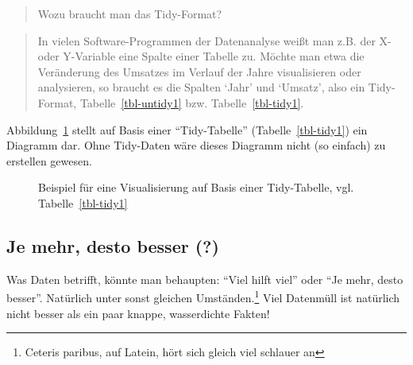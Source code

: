 \documentclass[
  a4paper,
]{scrbook}
\theoremstyle{definition}
\theoremstyle{definition}
\theoremstyle{definition}
\theoremstyle{remark}
\begin{document}
\begin{quote}
{} Wozu braucht man das Tidy-Format?
\end{quote}

\begin{quote}
{} In vielen Software-Programmen der Datenanalyse
weißt man z.B. der X- oder Y-Variable eine Spalte einer Tabelle zu.
Möchte man etwa die Veränderung des Umsatzes im Verlauf der Jahre
visualisieren oder analysieren, so braucht es die Spalten `Jahr' und
`Umsatz', also ein Tidy-Format, Tabelle~\ref{tbl-untidy1} bzw.
Tabelle~\ref{tbl-tidy1}.
\end{quote}

Abbildung~\ref{fig-tidy} stellt auf Basis einer ``Tidy-Tabelle''
(Tabelle~\ref{tbl-tidy1}) ein Diagramm dar. Ohne Tidy-Daten wäre dieses
Diagramm nicht (so einfach) zu erstellen gewesen.

\begin{figure}


\caption{\label{fig-tidy}Beispiel für eine Visualisierung auf Basis
einer Tidy-Tabelle, vgl. Tabelle~\ref{tbl-tidy1}}

\end{figure}%

\subsection{Je mehr, desto besser (?)}\label{je-mehr-desto-besser}

Was Daten betrifft, könnte man behaupten: ``Viel hilft viel'' oder ``Je
mehr, desto besser''. Natürlich unter sonst gleichen
Umständen.\footnote{Ceteris paribus, auf Latein, hört sich gleich viel
  schlauer an} Viel Datenmüll ist natürlich nicht besser als ein paar
knappe, wasserdichte Fakten!
\end{document}
